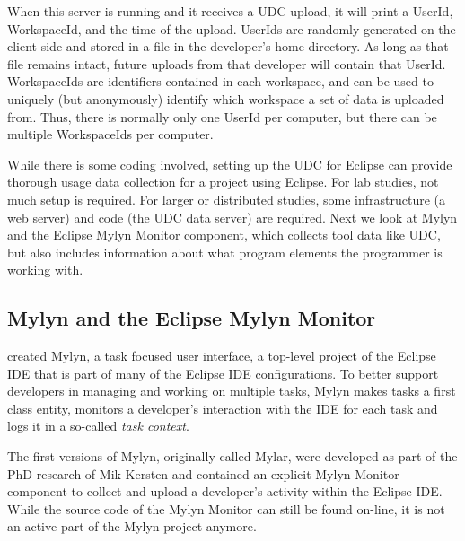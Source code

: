 \noindent
When this server is running and it receives a UDC upload,
it will print a UserId, WorkspaceId, and the time of the upload.
UserIds are randomly generated on the client side and stored in a file in
the developer's home directory.
As long as that file remains intact, future uploads from that developer will
contain that UserId.
WorkspaceIds are identifiers contained in each workspace, and can be
used to uniquely (but anonymously) identify which
workspace a set of data is uploaded from.
Thus, there is normally only one UserId per computer, but there can
be multiple WorkspaceIds per computer.

While there is some coding involved, setting up the UDC for Eclipse can provide thorough usage data collection for a project using Eclipse.   For lab studies, not much setup is required.  For larger or distributed studies, some infrastructure (a web server) and code (the UDC data server) are required.  Next we look at Mylyn and the Eclipse Mylyn Monitor component, which collects tool data like UDC, but also includes information about what program elements
the programmer is working with.

\subsection{Mylyn and the Eclipse Mylyn Monitor}
\label{MylynMonitor}




 created Mylyn, a task focused user interface, a top-level project of the Eclipse IDE that is part of many of the Eclipse IDE configurations. To better support developers in managing and working on multiple tasks, Mylyn makes tasks a first class entity, monitors a developer's interaction with the IDE for each task and logs it in a so-called \textit{task context}.

The first versions of Mylyn, originally called Mylar, were developed as part of the PhD research of Mik Kersten and contained an explicit Mylyn Monitor component to collect and upload a developer's activity within the Eclipse IDE. While the source code of the Mylyn Monitor can still be found on-line, it is not an active part of the Mylyn project anymore.

